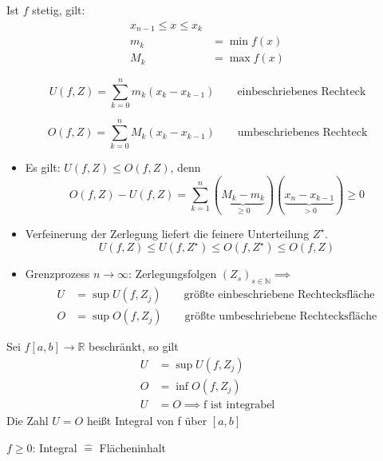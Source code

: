 \begin{note}
	Ist \( f \) stetig, gilt:
	\begin{align*}
		x_{n-1} \leq x \leq x_k \\
		m_k &= \min f(x) \\
		M_k &= \max f(x)
	\end{align*}	
\end{note}

\begin{definition}
	\[
		U(f, Z)= \sum_{k=0}^nm_k(x_k-x_{k-1}) \qquad \text{einbeschriebenes Rechteck}
	\]
\end{definition}


\begin{definition}
	\[
		O(f, Z)= \sum_{k=0}^nM_k(x_k-x_{k-1})  \qquad \text{umbeschriebenes Rechteck}
	\]
\end{definition}

\begin{itemize}
	\item Es gilt: \( U(f,Z) \leq O(f,Z) \), denn
	\[ O(f,Z)- U(f,Z)=\sum_{k=1}^n(\underbrace{M_k-m_k}_{\geq0})(\underbrace{x_n-x_{k-1}}_{>0}) \geq 0 \]
	\item Verfeinerung der Zerlegung liefert die feinere Unterteilung \( Z^\star \). 
	\[ U(f,Z) \leq U(f, Z^\star) \leq O(f,Z^\star) \leq O(f,Z) \]
	\item Grenzprozess \( n \rightarrow \infty \): Zerlegungsfolgen \( (Z_s)_{s\in\mathbb{N}} \implies \) 
	\begin{align*}
		U &= \sup U(f,Z_j) \qquad \text{größte einbeschriebene Rechtecksfläche}\\
		O &= \sup O(f,Z_j) \qquad \text{größte umbeschriebene Rechtecksfläche}
	\end{align*}
\end{itemize}

\begin{definition}[Integrierbarkeit]
	Sei \( f[a,b] \rightarrow \mathbb{R} \) beschränkt, so gilt
	\begin{align*}
		U &= \sup U(f,Z_j)\\
		O &= \inf O(f,Z_j)\\
		U &= O \implies \text{f ist integrabel}
	\end{align*}
	Die Zahl \( U = O \) heißt Integral von f über \( [a,b] \)
\end{definition}

\begin{note}
	\( f \geq 0 \): Integral \( \hat{=} \) Flächeninhalt
\end{note}

